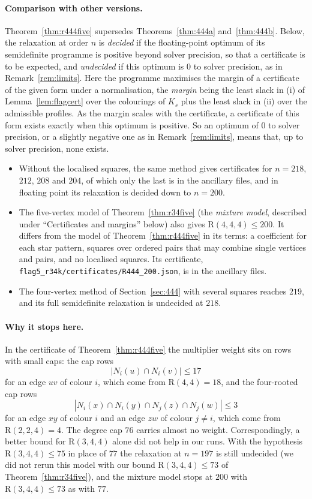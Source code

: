 \documentclass[11pt]{article}
\theoremstyle{spacedplain}
\theoremstyle{spaceddef}
\theoremstyle{spacedremark}
\newcommand{\R}{\mathrm{R}}
\begin{document}
\paragraph{Comparison with other versions.}
Theorem~\ref{thm:r444five} supersedes Theorems~\ref{thm:444a} and~\ref{thm:444b}.
Below, the relaxation at order $n$ is \emph{decided} if the floating-point optimum of its semidefinite programme is positive beyond solver precision, so that a certificate is to be expected, and \emph{undecided} if this optimum is $0$ to solver precision, as in Remark~\ref{rem:limits}.
Here the programme maximises the margin of a certificate of the given form under a normalisation, the \emph{margin} being the least slack in (i) of Lemma~\ref{lem:flagcert} over the colourings of $K_s$ plus the least slack in (ii) over the admissible profiles.
As the margin scales with the certificate, a certificate of this form exists exactly when this optimum is positive.
So an optimum of $0$ to solver precision, or a slightly negative one as in Remark~\ref{rem:limits}, means that, up to solver precision, none exists.
\begin{itemize}
\item Without the localised squares, the same method gives certificates for $n=218$, $212$, $208$ and $204$, of which only the last is in the ancillary files, and in floating point its relaxation is decided down to $n=200$.
\item The five-vertex model of Theorem~\ref{thm:r34five} (the \emph{mixture model}, described under ``Certificates and margins'' below) also gives $\R(4,4,4)\le 200$.
It differs from the model of Theorem~\ref{thm:r444five} in its terms: a coefficient for each star pattern, squares over ordered pairs that may combine single vertices and pairs, and no localised squares.
Its certificate, \texttt{flag5\_r34k/certificates/R444\_200.json}, is in the ancillary files.
\item The four-vertex method of Section~\ref{sec:444} with several squares reaches $219$, and its full semidefinite relaxation is undecided at $218$.
\end{itemize}

\paragraph{Why it stops here.}
In the certificate of Theorem~\ref{thm:r444five} the multiplier weight sits on rows with small caps: the cap rows
\[
|N_i(u)\cap N_i(v)|\le 17
\]
for an edge $uv$ of colour $i$, which come from $\R(4,4)=18$, and the four-rooted cap rows
\[
|N_i(x)\cap N_i(y)\cap N_j(z)\cap N_j(w)|\le 3
\]
for an edge $xy$ of colour $i$ and an edge $zw$ of colour $j\ne i$, which come from $\R(2,2,4)=4$.
The degree cap $76$ carries almost no weight.
Correspondingly, a better bound for $\R(3,4,4)$ alone did not help in our runs.
With the hypothesis $\R(3,4,4)\le 75$ in place of $77$ the relaxation at $n=197$ is still undecided (we did not rerun this model with our bound $\R(3,4,4)\le 73$ of Theorem~\ref{thm:r34five}), and the mixture model stops at $200$ with $\R(3,4,4)\le 73$ as with $77$.
\end{document}
